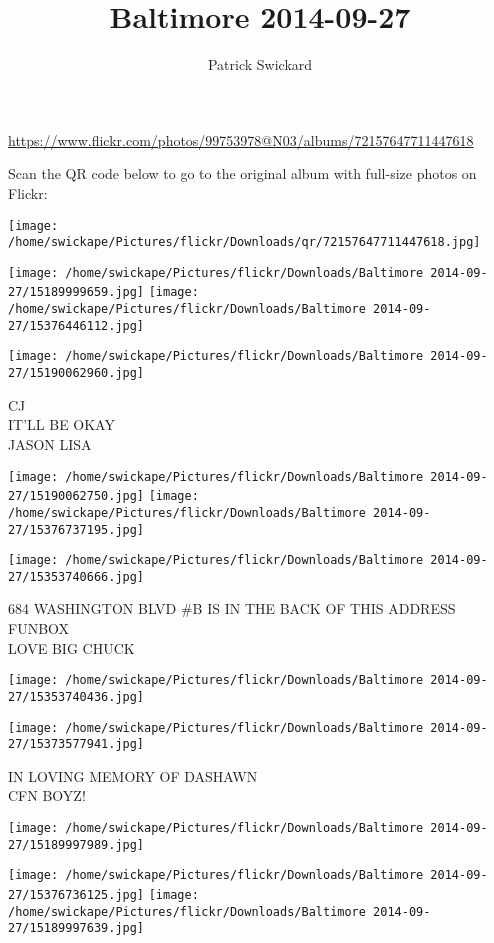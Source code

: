 \documentclass[10pt,letterpaper]{article}
\title{Baltimore 2014-09-27}
\author{Patrick Swickard}
\date{}
\begin{document}
\maketitle

\url{https://www.flickr.com/photos/99753978@N03/albums/72157647711447618}

Scan the QR code below to go to the original album with full-size photos on Flickr:

\texttt{[image: /home/swickape/Pictures/flickr/Downloads/qr/72157647711447618.jpg]}
\pagebreak

\texttt{[image: /home/swickape/Pictures/flickr/Downloads/Baltimore 2014-09-27/15189999659.jpg]}
\texttt{[image: /home/swickape/Pictures/flickr/Downloads/Baltimore 2014-09-27/15376446112.jpg]}

\vspace{0.25in}
\texttt{[image: /home/swickape/Pictures/flickr/Downloads/Baltimore 2014-09-27/15190062960.jpg]}

CJ\\
IT'LL BE OKAY\\
JASON LISA
\pagebreak

\texttt{[image: /home/swickape/Pictures/flickr/Downloads/Baltimore 2014-09-27/15190062750.jpg]}
\texttt{[image: /home/swickape/Pictures/flickr/Downloads/Baltimore 2014-09-27/15376737195.jpg]}

\vspace{0.25in}
\texttt{[image: /home/swickape/Pictures/flickr/Downloads/Baltimore 2014-09-27/15353740666.jpg]}

684 WASHINGTON BLVD \#B IS IN THE BACK OF THIS ADDRESS\\
FUNBOX\\
LOVE BIG CHUCK
\pagebreak

\texttt{[image: /home/swickape/Pictures/flickr/Downloads/Baltimore 2014-09-27/15353740436.jpg]}

\vspace{0.25in}
\texttt{[image: /home/swickape/Pictures/flickr/Downloads/Baltimore 2014-09-27/15373577941.jpg]}

IN LOVING MEMORY OF DASHAWN\\
CFN BOYZ!
\pagebreak

\texttt{[image: /home/swickape/Pictures/flickr/Downloads/Baltimore 2014-09-27/15189997989.jpg]}

\vspace{0.25in}
\texttt{[image: /home/swickape/Pictures/flickr/Downloads/Baltimore 2014-09-27/15376736125.jpg]}
\texttt{[image: /home/swickape/Pictures/flickr/Downloads/Baltimore 2014-09-27/15189997639.jpg]}
\end{document}
